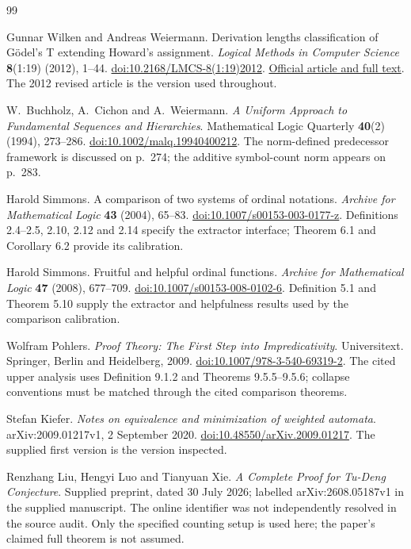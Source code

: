 \begin{thebibliography}{99}

Gunnar Wilken and Andreas Weiermann.
Derivation lengths classification of G\"odel's T extending Howard's assignment.
\emph{Logical Methods in Computer Science} \textbf{8}(1:19) (2012), 1--44.
\href{https://doi.org/10.2168/LMCS-8(1:19)2012}
{doi:10.2168/LMCS-8(1:19)2012}.
\href{https://lmcs.episciences.org/1073}{Official article and full text}.
The 2012 revised article is the version used throughout.

W.~Buchholz, A.~Cichon and A.~Weiermann.
\emph{A Uniform Approach to Fundamental Sequences and Hierarchies}.
Mathematical Logic Quarterly \textbf{40}(2) (1994), 273--286.
\href{https://doi.org/10.1002/malq.19940400212}{doi:10.1002/malq.19940400212}.
The norm-defined predecessor framework is discussed on p.~274; the
additive symbol-count norm appears on p.~283.

Harold Simmons.
A comparison of two systems of ordinal notations.
\emph{Archive for Mathematical Logic} \textbf{43} (2004), 65--83.
\href{https://doi.org/10.1007/s00153-003-0177-z}
{doi:10.1007/s00153-003-0177-z}.
Definitions 2.4--2.5, 2.10, 2.12 and 2.14 specify the extractor
interface; Theorem 6.1 and Corollary 6.2 provide its calibration.

Harold Simmons.
Fruitful and helpful ordinal functions.
\emph{Archive for Mathematical Logic} \textbf{47} (2008), 677--709.
\href{https://doi.org/10.1007/s00153-008-0102-6}
{doi:10.1007/s00153-008-0102-6}.
Definition 5.1 and Theorem 5.10 supply the extractor and helpfulness
results used by the comparison calibration.

Wolfram Pohlers.
\emph{Proof Theory: The First Step into Impredicativity}.
Universitext. Springer, Berlin and Heidelberg, 2009.
\href{https://doi.org/10.1007/978-3-540-69319-2}
{doi:10.1007/978-3-540-69319-2}.
The cited upper analysis uses Definition 9.1.2 and
Theorems 9.5.5--9.5.6; collapse conventions must be matched through the cited comparison theorems.

Stefan Kiefer.
\emph{Notes on equivalence and minimization of weighted automata}.
arXiv:2009.01217v1, 2 September 2020.
\href{https://doi.org/10.48550/arXiv.2009.01217}
{doi:10.48550/arXiv.2009.01217}.
The supplied first version is the version inspected.

Renzhang Liu, Hengyi Luo and Tianyuan Xie.
\emph{A Complete Proof for Tu-Deng Conjecture}.
Supplied preprint, dated 30 July 2026; labelled
arXiv:2608.05187v1 in the supplied manuscript.
The online identifier was not independently resolved in the source audit.
Only the specified counting setup is used here; the paper's claimed full
theorem is not assumed.


\end{thebibliography}
